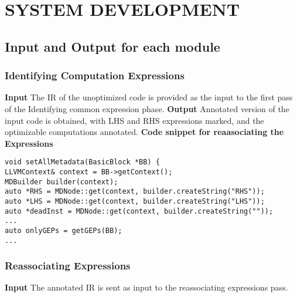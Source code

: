 
\chapter{SYSTEM DEVELOPMENT} %

\section{Input and Output for each module}
\subsection{Identifying Computation Expressions}
\noindent
\textbf{Input}
The IR of the unoptimized code is provided as the input to the first pass of the Identifying common expression phase.\newline
\hspace{35pt}\textbf{ Output}
Annotated version of the input code is obtained, with LHS and RHS expressions marked, and the optimizable computations annotated.\newline
\textbf{Code snippet for reaasociating the Expressions}

\begin{lstlisting}
void setAllMetadata(BasicBlock *BB) {
LLVMContext& context = BB->getContext();
MDBuilder builder(context);
auto *RHS = MDNode::get(context, builder.createString("RHS"));
auto *LHS = MDNode::get(context, builder.createString("LHS"));
auto *deadInst = MDNode::get(context, builder.createString(""));
...
auto onlyGEPs = getGEPs(BB);
...
\end{lstlisting}
\newpage

\subsection{Reassociating Expressions}
\noindent
\textbf{Input}\newline
The annotated IR is sent as input to the reassociating expressions pass.

